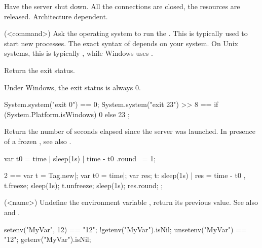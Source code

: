\begin{urbiscriptapi}
\item[shutdown] Have the \urbi server shut down.  All the connections
  are closed, the resources are released.  Architecture dependent.

\item[system](<command>)%
  Ask the operating system to run the .  This is
  typically used to start new processes.  The exact syntax of
   depends on your system.  On Unix systems, this is
  typically , while Windows uses .

  Return the exit status.

  \begin{windows}
    Under Windows, the exit status is always 0.
  \end{windows}

\begin{urbiassert}
System.system("exit 0") == 0;
System.system("exit 23") >> 8
       == { if (System.Platform.isWindows) 0 else 23 };
\end{urbiassert}


\item[time] Return the number of seconds elapsed since the \urbi
  server was launched.  In presence of a frozen , see
  also .
\begin{urbiassert}
{ var t0 = time | sleep(1s) | time - t0 }.round ~= 1;

  2 ==
  {
    var t = Tag.new|;
    var t0 = time|;
    var res;
    t: { sleep(1s) | res = time - t0 },
    t.freeze;
    sleep(1s);
    t.unfreeze;
    sleep(1s);
    res.round;
  };
\end{urbiassert}

\item[unsetenv](<name>)%
  Undefine the environment variable , return its previous
  value.  See also  and
  .

\begin{urbiassert}
setenv("MyVar", 12) == "12";
!getenv("MyVar").isNil;
unsetenv("MyVar") == "12";
getenv("MyVar").isNil;
\end{urbiassert}


\end{urbiscriptapi}

